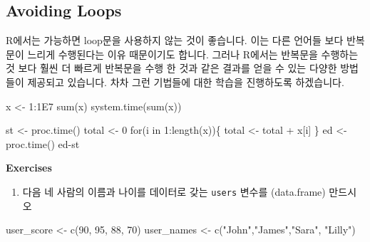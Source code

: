 \documentclass[
  a4paper,
]{book}
\newenvironment{Shaded}{\begin{snugshade}}{\end{snugshade}}
\newcommand{\ControlFlowTok}[1]{\textcolor[rgb]{0.00,0.23,0.31}{#1}}
\newcommand{\DecValTok}[1]{\textcolor[rgb]{0.68,0.00,0.00}{#1}}
\newcommand{\FloatTok}[1]{\textcolor[rgb]{0.68,0.00,0.00}{#1}}
\newcommand{\FunctionTok}[1]{\textcolor[rgb]{0.28,0.35,0.67}{#1}}
\newcommand{\NormalTok}[1]{\textcolor[rgb]{0.00,0.23,0.31}{#1}}
\newcommand{\OtherTok}[1]{\textcolor[rgb]{0.00,0.23,0.31}{#1}}
\newcommand{\SpecialCharTok}[1]{\textcolor[rgb]{0.37,0.37,0.37}{#1}}
\newcommand{\StringTok}[1]{\textcolor[rgb]{0.13,0.47,0.30}{#1}}
\providecommand{\tightlist}{%
  \setlength{\itemsep}{0pt}\setlength{\parskip}{0pt}}\usepackage{longtable,booktabs,array}
\begin{document}
\hypertarget{avoiding-loops}{%
\subsection{Avoiding Loops}\label{avoiding-loops}}

R에서는 가능하면 loop문을 사용하지 않는 것이 좋습니다. 이는 다른 언어들
보다 반복문이 느리게 수행된다는 이유 때문이기도 합니다. 그러나 R에서는
반복문을 수행하는 것 보다 훨씬 더 빠르게 반복문을 수행 한 것과 같은
결과를 얻을 수 있는 다양한 방법들이 제공되고 있습니다. 차차 그런
기법들에 대한 학습을 진행하도록 하겠습니다.

\begin{Shaded}
\begin{Highlighting}[]
\NormalTok{x }\OtherTok{\textless{}{-}} \DecValTok{1}\SpecialCharTok{:}\FloatTok{1E7}
\FunctionTok{sum}\NormalTok{(x)}
\FunctionTok{system.time}\NormalTok{(}\FunctionTok{sum}\NormalTok{(x))}

\NormalTok{st }\OtherTok{\textless{}{-}} \FunctionTok{proc.time}\NormalTok{()}
\NormalTok{total }\OtherTok{\textless{}{-}} \DecValTok{0}
\ControlFlowTok{for}\NormalTok{(i }\ControlFlowTok{in} \DecValTok{1}\SpecialCharTok{:}\FunctionTok{length}\NormalTok{(x))\{}
\NormalTok{  total }\OtherTok{\textless{}{-}}\NormalTok{ total }\SpecialCharTok{+}\NormalTok{ x[i]}
\NormalTok{\}}
\NormalTok{ed }\OtherTok{\textless{}{-}} \FunctionTok{proc.time}\NormalTok{()}
\NormalTok{ed}\SpecialCharTok{{-}}\NormalTok{st}
\end{Highlighting}
\end{Shaded}

\textbf{Exercises}

\begin{enumerate}
\def\labelenumi{\arabic{enumi})}
\tightlist
\item
  다음 네 사람의 이름과 나이를 데이터로 갖는 \texttt{users} 변수를
  (data.frame) 만드시오
\end{enumerate}

\begin{Shaded}
\begin{Highlighting}[]
\NormalTok{user\_score }\OtherTok{\textless{}{-}} \FunctionTok{c}\NormalTok{(}\DecValTok{90}\NormalTok{, }\DecValTok{95}\NormalTok{, }\DecValTok{88}\NormalTok{, }\DecValTok{70}\NormalTok{)}
\NormalTok{user\_names }\OtherTok{\textless{}{-}} \FunctionTok{c}\NormalTok{(}\StringTok{"John"}\NormalTok{,}\StringTok{"James"}\NormalTok{,}\StringTok{"Sara"}\NormalTok{, }\StringTok{"Lilly"}\NormalTok{)}
\end{Highlighting}
\end{Shaded}
\end{document}
